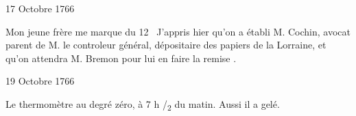                      \begin{diary}{17 Octobre 1766}{}
                        
                        
                           Mon jeune frère me marque
                           du 12  \og 
                              J’appris hier qu’on a établi M.
                                 Cochin, avocat parent
                              de M. le controleur
                                 général, dépositaire
                              des papiers de la
                              Lorraine, et qu’on attendra
                              M. Bremon pour lui en faire la
                              remise  \fg{}. \bigskip
        
        
                     \end{diary}

                     \begin{diary}{19 Octobre 1766}{}
                        
                         Le thermomètre au degré zéro, à 7 h /\textsubscript{2}
                              du matin. Aussi il a gelé. \bigskip
        
        
                     \end{diary}

